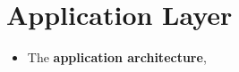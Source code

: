 \section{Application Layer}
\begin{itemize}

\item The \textbf{application architecture}, 

\end{itemize}